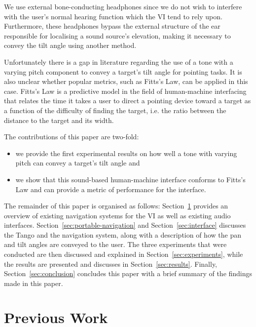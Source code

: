 \documentclass[format=sigconf, review=true, screen=true, anonymous=true]{acmart}
\begin{document}
We use external bone-conducting headphones since we do not wish to interfere with the user's normal hearing function which the VI tend to rely upon. Furthermore, these headphones bypass the external structure of the ear responsible for localising a sound source's elevation, making it necessary to convey the tilt angle using another method. 

Unfortunately there is a gap in literature regarding the use of a tone with a varying pitch component to convey a target's tilt angle for pointing tasks. It is also unclear whether popular metrics, such as Fitts's Law, can be applied in this case. Fitts's Law is a predictive model in the field of human-machine interfacing that relates the time it takes a user to direct a pointing device toward a target as a function of the difficulty of finding the target, i.e. the ratio between the distance to the target and its width. 

The contributions of this paper are two-fold: 

\begin{itemize}
  \item we provide the first experimental results on how well a tone with varying pitch can convey a target's tilt angle and 
  \item we show that this sound-based human-machine interface conforms to Fitts's Law and can provide a metric of performance for the interface.
\end{itemize}

The remainder of this paper is organised as follows: Section~\ref{sec:lit-review} provides an overview of existing navigation systems for the VI as well as existing audio interfaces. Section~\ref{sec:portable-navigation} and Section~\ref{sec:interface} discusses the Tango and the navigation system, along with a description of how the pan and tilt angles are conveyed to the user. The three experiments that were conducted are then discussed and explained in Section~\ref{sec:experiments}, while the results are presented and discusses in Section~\ref{sec:results}. Finally, Section~\ref{sec:conclusion} concludes this paper with a brief summary of the findings made in this paper. 

\section{Previous Work}
\label{sec:lit-review}

\end{document}
